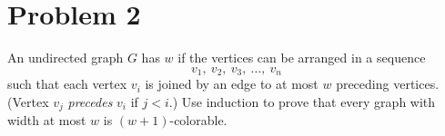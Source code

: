 \documentclass[12pt]{article}
\begin{document}
%
%

\section*{Problem 2}
An undirected graph $G$ has  $w$ if the vertices can be
arranged in a sequence
%
\[
v_1,\ v_2,\ v_3,\ \ldots,\ v_n
\]
%
such that each vertex $v_i$ is joined by an edge to at most $w$
preceding vertices.  (Vertex $v_j$ \textit{precedes} $v_i$ if $j <
i$.)  Use induction to prove that every graph with width at most $w$
is $(w + 1)$-colorable.
\end{document}
